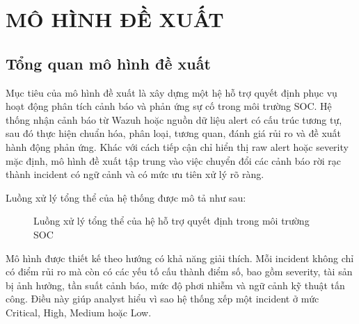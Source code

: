\documentclass[a4paper,12pt,oneside]{book}
\begin{document}
\chapter{\MakeTextUppercase{Mô hình đề xuất}}

\section{Tổng quan mô hình đề xuất}
{\fontsize{13pt}{15.6pt}\selectfont

Mục tiêu của mô hình đề xuất là xây dựng một hệ hỗ trợ quyết định phục vụ hoạt động phân tích cảnh báo và phản ứng sự cố trong môi trường SOC. Hệ thống nhận cảnh báo từ Wazuh hoặc nguồn dữ liệu alert có cấu trúc tương tự, sau đó thực hiện chuẩn hóa, phân loại, tương quan, đánh giá rủi ro và đề xuất hành động phản ứng. Khác với cách tiếp cận chỉ hiển thị raw alert hoặc severity mặc định, mô hình đề xuất tập trung vào việc chuyển đổi các cảnh báo rời rạc thành incident có ngữ cảnh và có mức ưu tiên xử lý rõ ràng.

\noindent Luồng xử lý tổng thể của hệ thống được mô tả như sau:

\begin{figure}[htbp]
\centering
{}
\caption{Luồng xử lý tổng thể của hệ hỗ trợ quyết định trong môi trường SOC}
\label{fig:soc-dss-workflow}
\end{figure}

\noindent Mô hình được thiết kế theo hướng có khả năng giải thích. Mỗi incident không chỉ có điểm rủi ro mà còn có các yếu tố cấu thành điểm số, bao gồm severity, tài sản bị ảnh hưởng, tần suất cảnh báo, mức độ phơi nhiễm và ngữ cảnh kỹ thuật tấn công. Điều này giúp analyst hiểu vì sao hệ thống xếp một incident ở mức Critical, High, Medium hoặc Low.

}
\end{document}
